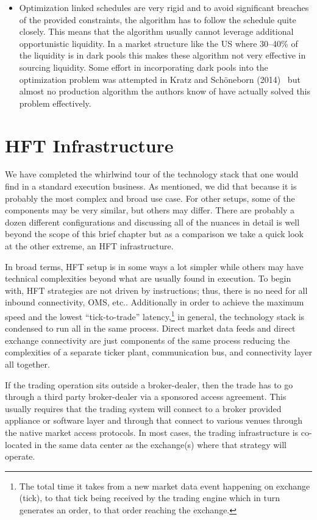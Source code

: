 \begin{itemize}
\item Optimization linked schedules are very rigid and to avoid significant breaches of the provided constraints, the algorithm has to follow the schedule quite closely. This means that the algorithm usually cannot leverage additional opportunistic liquidity. In a market structure like the US where 30--40\% of the liquidity is in dark pools this makes these algorithm not very effective in sourcing liquidity. Some effort in incorporating dark pools into the optimization problem was attempted in Kratz and Sch\"oneborn (2014)~\cite{kratzschon} but almost no production algorithm the authors know of have actually solved this problem effectively. 
\end{itemize}



\section{HFT Infrastructure\label{sec:hft_infra}}\label{in:hpi}

We have completed the whirlwind tour of the technology stack that one would find in a standard execution business. As mentioned, we did  that because it is probably the most complex and broad use case. For other setups, some of the components may be very similar, but others may differ. There are probably a dozen different configurations and discussing all of the nuances in detail is well beyond the scope of this brief chapter but as a comparison we take a quick look at the other extreme, an HFT infrastructure.


In broad terms, HFT setup is in some ways a lot simpler while others may have technical complexities beyond what are usually found in execution. To begin with, HFT strategies are not driven by instructions; thus, there is no need for all inbound connectivity, OMS, etc..  Additionally in order to achieve the maximum speed and the lowest  ``tick-to-trade'' latency,\footnote{The total time it takes from a new market data event happening on exchange (tick), to that tick being received by the trading engine which in turn generates an order, to that order reaching the exchange.} in general, the technology stack is condensed to run all in the same process. Direct market data feeds and direct exchange connectivity are just components of the same process reducing the complexities of a separate ticker plant, communication bus, and connectivity layer all together. 


If the trading operation sits outside a broker-dealer, then the trade has to go through a third party broker-dealer via a sponsored access agreement. This usually requires that the trading system will connect to a broker provided appliance or software layer and through that connect to various venues through the native market access protocols. In most cases, the trading infrastructure is co-located in the same data center as the exchange(s) where that strategy will operate.


